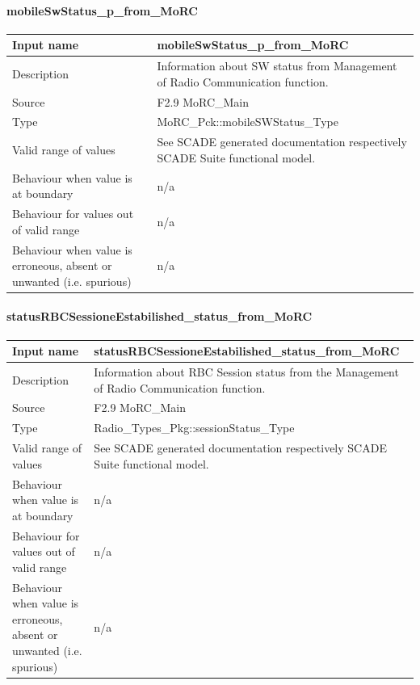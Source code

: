 \paragraph{mobileSwStatus\_p\_from\_MoRC}

\begin{longtable}{p{}p{}}
\toprule
Input name				& mobileSwStatus\_p\_from\_MoRC  \\
\midrule
Description				& Information about SW status from Management of Radio Communication function. \\
\midrule
Source					& F2.9 MoRC\_Main\\ 
\midrule
Type					& MoRC\_Pck::mobileSWStatus\_Type \\
\midrule
Valid range of values	& See SCADE generated documentation respectively SCADE Suite functional model. \\
\midrule
Behaviour when value is at boundary	&n/a \\
\midrule
Behaviour for values out of valid range	& n/a \\
\midrule
Behaviour when value is erroneous, absent or unwanted (i.e. spurious) & n/a \\
\bottomrule
\end{longtable}

\paragraph{statusRBCSessioneEstabilished\_status\_from\_MoRC}

\begin{longtable}{p{}p{}}
\toprule
Input name				& statusRBCSessioneEstabilished\_status\_from\_MoRC  \\
\midrule
Description				& Information about RBC Session status from the Management of Radio Communication function. \\
\midrule
Source					&  F2.9 MoRC\_Main\\ 
\midrule
Type					& Radio\_Types\_Pkg::sessionStatus\_Type \\
\midrule
Valid range of values	& See SCADE generated documentation respectively SCADE Suite functional model. \\
\midrule
Behaviour when value is at boundary	& n/a \\
\midrule
Behaviour for values out of valid range	& n/a \\
\midrule
Behaviour when value is erroneous, absent or unwanted (i.e. spurious) & n/a \\
\bottomrule
\end{longtable}

